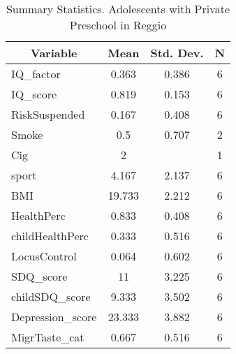 
\begin{table}[htbp]\centering \caption{Summary Statistics. Adolescents with Private Preschool in Reggio \label{bothAdolmaternaPrivReggio}}
\begin{tabular}{l c c  c}\hline\hline
\multicolumn{1}{c}{\textbf{Variable}} & \textbf{Mean}
 & \textbf{Std. Dev.} & \textbf{N}\\ \hline
IQ\_factor & 0.363 & 0.386  & 6\\
IQ\_score & 0.819 & 0.153  & 6\\
RiskSuspended & 0.167 & 0.408  & 6\\
Smoke & 0.5 & 0.707  & 2\\
Cig & 2 &   & 1\\
sport & 4.167 & 2.137  & 6\\
BMI & 19.733 & 2.212  & 6\\
HealthPerc & 0.833 & 0.408  & 6\\
childHealthPerc & 0.333 & 0.516  & 6\\
LocusControl & 0.064 & 0.602  & 6\\
SDQ\_score & 11 & 3.225  & 6\\
childSDQ\_score & 9.333 & 3.502  & 6\\
Depression\_score & 23.333 & 3.882  & 6\\
MigrTaste\_cat & 0.667 & 0.516  & 6\\
\hline\end{tabular}
\end{table}
